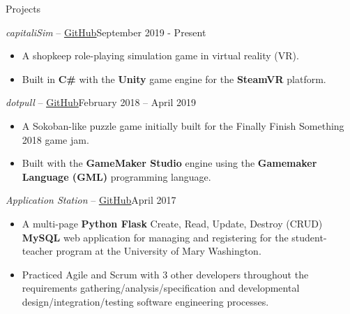 \documentclass[calibri]{mcdowellcv}
\begin{document}
	\begin{cvsection}{Projects}
		\begin{cvsubsection}{\textit{capitaliSim} -- \href{https://github.com/acarlyle/shopvr}{\underline{GitHub}}}{September 2019 - Present}	
			\begin{itemize}
				\item A shopkeep role-playing simulation game in virtual reality (VR).
				\item Built in \textbf{C\#} with the \textbf{Unity} game engine for the \textbf{SteamVR} platform.  
			\end{itemize}
		\end{cvsubsection}
		
		\begin{cvsubsection}{\textit{dotpull} -- \href{https://github.com/acarlyle/dotpull}{\underline{GitHub}}}{February 2018 -- April 2019}	
			\begin{itemize}
				\item A Sokoban-like puzzle game initially built for the Finally Finish Something 2018 game jam.  
				\item Built with the \textbf{GameMaker Studio} engine using the \textbf{Gamemaker Language (GML)} programming language.  
			\end{itemize}
		\end{cvsubsection}
		
		\begin{cvsubsection}{\textit{Application Station} -- \href{https://github.com/acarlyle/InformationStation}{\underline{GitHub}}}{April 2017}		
			\begin{itemize}
				\item A multi-page \textbf{Python Flask} Create, Read, Update, Destroy (CRUD) \textbf{MySQL} web application for managing and registering for the student-teacher program at the University of Mary Washington.   
				\item Practiced Agile and Scrum with 3 other developers throughout the requirements gathering/analysis/specification and developmental design/integration/testing software engineering processes. 
			\end{itemize}
		\end{cvsubsection}
	\end{cvsection}
\end{document}
